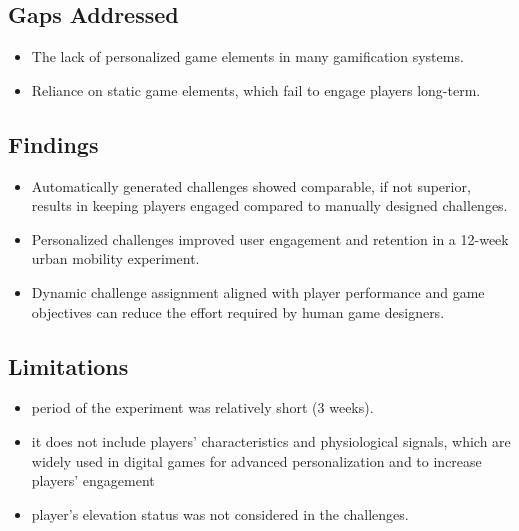 \subsection{Gaps Addressed}
\begin{itemize}
    \item The lack of personalized game elements in many gamification systems.
    \item Reliance on static game elements, which fail to engage players long-term.
\end{itemize}

\subsection{Findings}
\begin{itemize}
    \item Automatically generated challenges showed comparable, if not superior, results in keeping players engaged compared to manually designed challenges.
    \item Personalized challenges improved user engagement and retention in a 12-week urban mobility experiment.
    \item Dynamic challenge assignment aligned with player performance and game objectives can reduce the effort required by human game designers.
\end{itemize}

\subsection{Limitations}
\begin{itemize}
    \item period of the experiment was relatively short (3 weeks).
    \item it does not include
    players’ characteristics and physiological signals, which are widely used in digital
    games for advanced personalization and to increase players’ engagement
    \item player's elevation status was not considered in the challenges.
\end{itemize}

